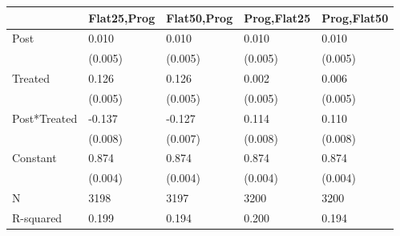 \begin{tabular}{lllll}
\toprule
 & Flat25,Prog & Flat50,Prog & Prog,Flat25 & Prog,Flat50 \\
\midrule
Post & 0.010 & 0.010 & 0.010 & 0.010 \\
 & (0.005) & (0.005) & (0.005) & (0.005) \\
Treated & 0.126 & 0.126 & 0.002 & 0.006 \\
 & (0.005) & (0.005) & (0.005) & (0.005) \\
Post*Treated & -0.137 & -0.127 & 0.114 & 0.110 \\
 & (0.008) & (0.007) & (0.008) & (0.008) \\
Constant & 0.874 & 0.874 & 0.874 & 0.874 \\
 & (0.004) & (0.004) & (0.004) & (0.004) \\
N & 3198 & 3197 & 3200 & 3200 \\
R-squared & 0.199 & 0.194 & 0.200 & 0.194 \\
\bottomrule
\end{tabular}
